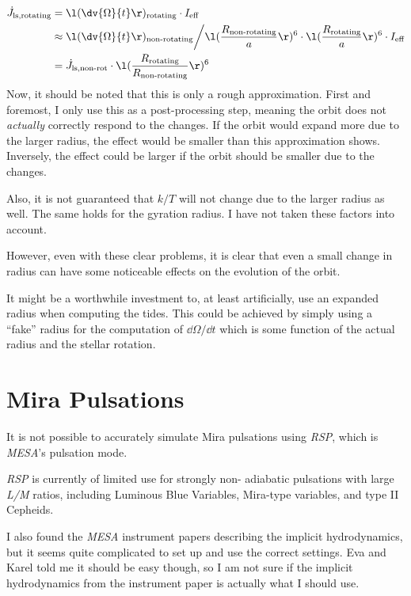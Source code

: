 \documentclass[a4paper,10pt]{article}
\begin{document}
\begin{align*}
    \dot{J}_\text{ls,rotating} &=  \l(\dv{\Omega}{t}\r)_\text{rotating} \cdot I_\text{eff}\\
    &\approx  \l(\dv{\Omega}{t}\r)_\text{non-rotating} \bigg/ \l(\frac{R_\text{non-rotating}}{a}\r)^{6} \cdot \l(\frac{R_\text{rotating}}{a}\r)^{6}\cdot I_\text{eff}\\
    &= \dot{J}_\text{ls,non-rot} \cdot  \l(\frac{R_\text{rotating}}{R_\text{non-rotating}}\r)^{6}
\end{align*}
Now, it should be noted that this is only a rough approximation. First and foremost, I only use this as a post-processing step, meaning the orbit does not \emph{actually} correctly respond to the changes. If the orbit would expand more due to the larger radius, the effect would be smaller than this approximation shows. Inversely, the effect could be larger if the orbit should be smaller due to the changes. 

Also, it is not guaranteed that \(k / T\) will not change due to the larger radius as well. The same holds for the gyration radius. I have not taken these factors into account.

However, even with these clear problems, it is clear that even a small change in radius can have some noticeable effects on the evolution of the orbit.

It might be a worthwhile investment to, at least artificially, use an expanded radius when computing the tides. This could be achieved by simply using a ``fake'' radius for the computation of \(\dd{\Omega } / \dd{t} \) which is some function of the actual radius and the stellar rotation.

\section{Mira Pulsations}

It is not possible to accurately simulate Mira pulsations using \emph{RSP}, which is \emph{MESA}'s pulsation mode.

\begin{shadequote}[l]{\citet{paxton2019}}
\emph{RSP} is currently of limited use for strongly non-
adiabatic pulsations with large \emph{L/M} ratios, including Luminous Blue Variables, Mira-type variables, and
type II Cepheids.
\end{shadequote}

I also found the \emph{MESA} instrument papers describing the implicit hydrodynamics, but it seems quite complicated to set up and use the correct settings. Eva and Karel told me it should be easy though, so I am not sure if the implicit hydrodynamics from the instrument paper is actually what I should use.
\end{document}
